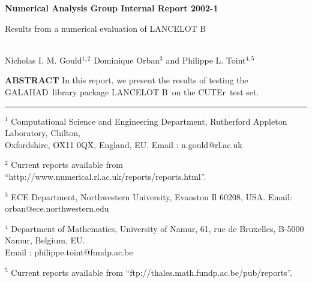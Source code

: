 \documentclass[11pt,twoside]{article}
\title{\papertitle}
\author{\paperauthor}
\newcommand{\gal}{{\sf GALAHAD}}
\newcommand{\lanb}{{\sf LANCELOT B}}
\newcommand{\cuter}{{\sf CUTEr}}
\newcommand{\theabstract}{In this report, we present the
results of testing the \gal\ library package \lanb\ on the \cuter\ test set.}
\begin{document}
%


\begin{titlepage}

\begin{flushright} {\large \bf Numerical Analysis Group Internal Report 2002-1} \end{flushright}
\vspace*{0.2 cm}

{\LARGE \bf
\begin{center}
Results from a numerical evaluation of \lanb
\end{center}}
\vspace*{0.1 cm}
\begin{center}
\mbox{} \\
      Nicholas I. M. Gould$^{1,2}$
      Dominique Orban$^{3}$
      and
      Philippe L. Toint$^{4,5}$
\\
\end{center}

\vspace{0.4cm}

\begin{center}
\parbox{\textwidth}{
{
{\bf  ABSTRACT \newline}
\theabstract}
}
\end{center}

\vspace{0.2 cm}

\noindent \rule{\textwidth}{0.001in}
\vspace{0.1 cm}

{\small
\begin{description}
\item  $^1$ Computational Science and Engineering Department,
       Rutherford Appleton Laboratory,
       Chilton, \\ Oxfordshire, OX11 0QX, England, EU.
       Email : n.gould@rl.ac.uk
\item  $^2$ Current reports available from %
       ``http://www.numerical.rl.ac.uk/reports/reports.html''.
\item $^3$ ECE Department,  Northwestern University, Evanston Il 60208, USA.
       Email: orban@ece.northwestern.edu
\item  $^4$ Department of Mathematics, University of Namur,
       61, rue de Bruxelles, B-5000 Namur, Belgium, EU. \\
       Email : philippe.toint@fundp.ac.be
\item  $^5$ Current reports available from %
       ``ftp://thales.math.fundp.ac.be/pub/reports''.
\end{description}
}


\end{titlepage}
\end{document}
